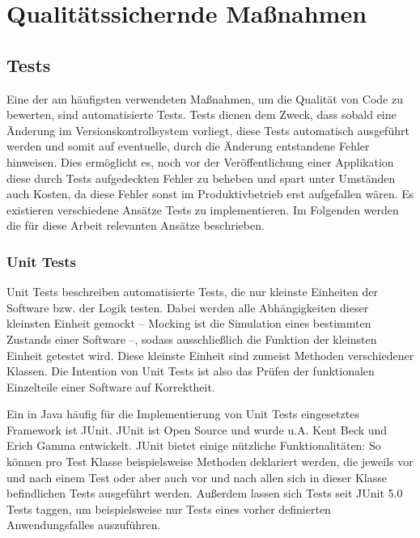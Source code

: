 	\section{Qualitätssichernde Maßnahmen} %
	
		\subsection{Tests} %
		\label{qm.tests}
		
			Eine der am häufigsten verwendeten Maßnahmen, um die Qualität von Code zu bewerten, sind automatisierte Tests. Tests dienen dem Zweck, dass sobald eine Änderung im Versionskontrollsystem vorliegt, diese Tests automatisch ausgeführt werden und somit auf eventuelle, durch die Änderung entstandene Fehler hinweisen. Dies ermöglicht es, noch vor der Veröffentlichung einer Applikation diese durch Tests aufgedeckten Fehler zu beheben und spart unter Umständen auch Kosten, da diese Fehler sonst im Produktivbetrieb erst aufgefallen wären. \cite{Huizinga.2007} Es existieren verschiedene Ansätze Tests zu implementieren. Im Folgenden werden die für diese Arbeit relevanten Ansätze beschrieben. 
			
			\subsubsection{Unit Tests}
			
				Unit Tests beschreiben automatisierte Tests, die nur kleinste Einheiten der Software bzw. der Logik testen. Dabei werden alle Abhängigkeiten dieser kleinsten Einheit gemockt -- Mocking ist die Simulation eines bestimmten Zustands einer Software --, sodass ausschließlich die Funktion der kleinsten Einheit getestet wird. Diese kleinste Einheit sind zumeist Methoden verschiedener Klassen. Die Intention von Unit Tests ist also das Prüfen der funktionalen Einzelteile einer Software auf Korrektheit. 
			
				Ein in Java häufig für die Implementierung von Unit Tests eingesetztes Framework ist JUnit. JUnit ist Open Source und wurde u.A. Kent Beck und Erich Gamma entwickelt. JUnit bietet einige nützliche Funktionalitäten: So können pro Test Klasse beispielsweise Methoden deklariert werden, die jeweils vor und nach einem Test oder aber auch vor und nach allen sich in dieser Klasse befindlichen Tests ausgeführt werden. Außerdem lassen sich Tests seit JUnit 5.0 Tests taggen, um beispielsweise nur Tests eines vorher definierten Anwendungsfalles auszuführen. \cite{JUnitTeam.312020}
				
